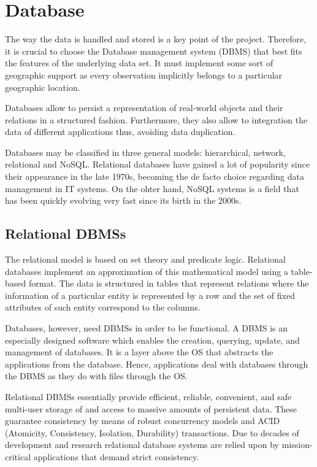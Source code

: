 \section{Database}

The way the data is handled and stored is a key point of the project. Therefore, it is crucial to choose the Database management system (DBMS) that best fits the features of the underlying data set. It must implement some sort of geographic support as every observation implicitly belongs to a particular geographic location.

Databases allow to persist a representation of real-world objects and their relations in a structured fashion. Furthermore, they also allow to integration the data of different applications thus, avoiding data duplication.

Databases may be classified in three general models: hierarchical, network, relational and NoSQL. Relational databases have gained a lot of popularity since their appearance in the late 1970s, becoming the de facto choice regarding data management in IT systems. On the ohter hand, NoSQL systems is a field that has been quickly evolving very fast since its birth in the 2000s.

\subsection{Relational DBMSs}

The relational model is based on set theory and predicate logic. Relational databases implement an approximation of this mathematical model using a table-based format. The data is structured in tables that represent relations where the information of a particular entity is represented by a row and the set of fixed attributes of such entity correspond to the columns.

Databases, however, need DBMSs in order to be functional. A DBMS is an especially designed software which enables the creation, querying, update, and management of databases. It is a layer above the OS that abstracts the applications from the database. Hence, applications deal with databases through the DBMS as they do with files through the OS.

Relational DBMSs essentially provide efficient, reliable, convenient, and safe multi-user storage of and access to massive amounts of persistent data. These guarantee consistency by means of robust concurrency models and ACID (Atomicity, Consistency, Isolation, Durability) transactions. Due to decades of development and research relational database systems are relied upon by mission-critical applications that demand strict consistency.


